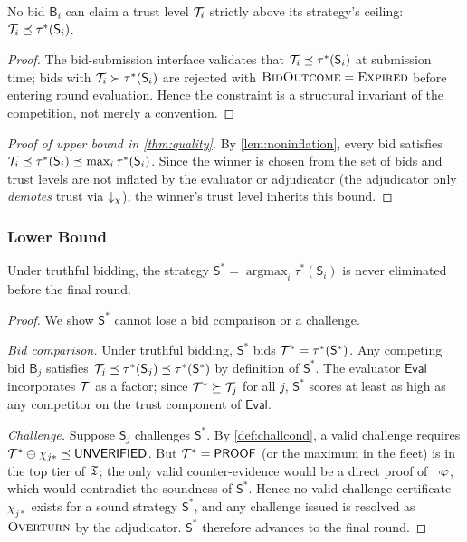 \documentclass[11pt]{article}
\providecommand{\Strat}{\mathsf{S}}               %
\providecommand{\Bid}{\mathsf{B}}                 %
\providecommand{\Eval}{\mathsf{Eval}}             %
\providecommand{\BidOut}{\textsc{BidOutcome}}     %
\providecommand{\OVERTURN}{\textsc{Overturn}}
\providecommand{\tgeq}{\succeq}          %
\providecommand{\argmax}{\operatorname{argmax}}
\begin{document}
\begin{lemma}\label{lem:noninflation}
No bid $\Bid_i$ can claim a trust level $\mathcal{T}_i$ strictly above its
strategy's ceiling: $\trust_i \tleq \tau^*(\Strat_i)$.
\end{lemma}
\begin{proof}
The bid-submission interface validates that $\trust_i \tleq \tau^*(\Strat_i)$
at submission time; bids with $\trust_i \succ \tau^*(\Strat_i)$ are rejected
with $\BidOut{} = \textsc{Expired}$ before entering round evaluation.  Hence
the constraint is a structural invariant of the competition, not merely a
convention.
\end{proof}

\begin{proof}[Proof of upper bound in \cref{thm:quality}]
By \cref{lem:noninflation}, every bid satisfies $\trust_i \tleq
\tau^*(\Strat_i) \tleq \max_i \tau^*(\Strat_i)$.  Since the winner is chosen
from the set of bids and trust levels are not inflated by the evaluator or
adjudicator (the adjudicator only \emph{demotes} trust via $\downarrow_\chi$), the
winner's trust level inherits this bound.
\end{proof}

\subsubsection{Lower Bound}

\begin{lemma}\label{lem:survival}
Under truthful bidding, the strategy $\Strat^* = \argmax_i \tau^*(\Strat_i)$
is never eliminated before the final round.
\end{lemma}
\begin{proof}
We show $\Strat^*$ cannot lose a bid comparison or a challenge.

\emph{Bid comparison.}  Under truthful bidding, $\Strat^*$ bids $\trust^* =
\tau^*(\Strat^*)$.  Any competing bid $\Bid_j$ satisfies $\trust_j \tleq
\tau^*(\Strat_j) \tleq \tau^*(\Strat^*)$ by definition of $\Strat^*$.
The evaluator $\Eval$ incorporates $\mathcal{T}$ as a factor; since
$\trust^* \tgeq \trust_j$ for all $j$, $\Strat^*$ scores at least as high as
any competitor on the trust component of $\Eval$.

\emph{Challenge.}  Suppose $\Strat_j$ challenges $\Strat^*$.  By
\cref{def:challcond}, a valid challenge requires $\mathcal{T}^* \ominus \chi_{j*}
\preceq \mathsf{UNVERIFIED}$.  But $\mathcal{T}^* = \mathsf{PROOF}$ (or the maximum in the fleet) is
in the top tier of $\mathfrak{T}$; the only valid counter-evidence would be a direct
proof of $\neg\varphi$, which would contradict the soundness of $\Strat^*$.
Hence no valid challenge certificate $\chi_{j*}$ exists for a sound strategy
$\Strat^*$, and any challenge issued is resolved as $\OVERTURN$ by the
adjudicator.  $\Strat^*$ therefore advances to the final round.
\end{proof}
\end{document}
